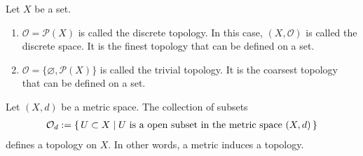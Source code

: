 %
\begin{exmbox}
    \begin{example}
        Let \(X\) be a {\color{mathif}set}.
        \begin{enumerate}
            \item \(\mathcal{O} = \mathcal{P}(X)\) is called the {\color{maththen}discrete topology}. In this case, \((X, \mathcal{O})\) is called the {\color{maththen}discrete space}. It is the {\color{mathrem}finest topology} that can be defined on a set.
            \item \(\mathcal{O} = \{\varnothing, \mathcal{P}(X)\}\) is called the {\color{maththen}trivial topology}. It is the coarsest topology that can be defined on a set.
        \end{enumerate}
    \end{example}
\end{exmbox}

\begin{thmbox}
    \begin{proposition}
        Let \((X, d)\) be a metric space. The collection of subsets
        \begin{align*}
            \mathcal{O}_d := \left\{\, U \subset X \mid U \text{ is a open subset in the metric space } (X, d) \,\right\}
        \end{align*}
        defines a topology on \(X\). In other words, a metric induces a topology.
    \end{proposition}
\end{thmbox}

